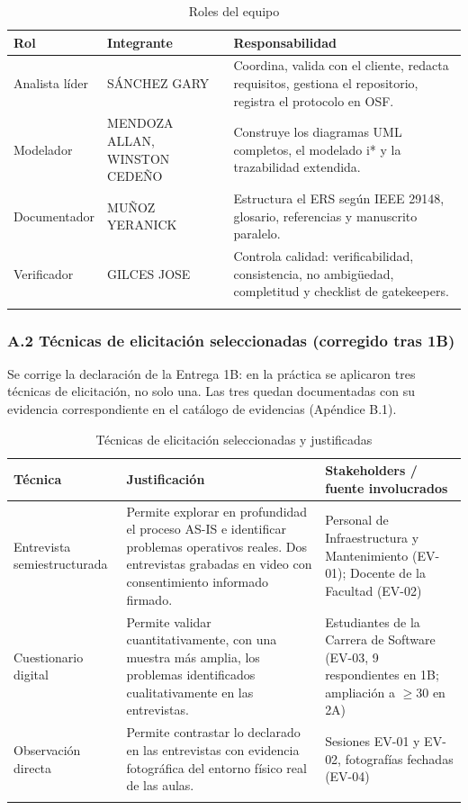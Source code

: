 
\begingroup
\small
\begin{longtable}{|p{5.2cm}|p{5.2cm}|p{5.2cm}|}
\hline
Rol & Integrante & Responsabilidad \\ \hline
Analista líder & SÁNCHEZ GARY & Coordina, valida con el cliente, redacta requisitos, gestiona el repositorio, registra el protocolo en OSF. \\ \hline
Modelador & MENDOZA ALLAN, WINSTON CEDEÑO & Construye los diagramas UML completos, el modelado i* y la trazabilidad extendida. \\ \hline
Documentador & MUÑOZ YERANICK & Estructura el ERS según IEEE 29148, glosario, referencias y manuscrito paralelo. \\ \hline
Verificador & GILCES JOSE & Controla calidad: verificabilidad, consistencia, no ambigüedad, completitud y checklist de gatekeepers. \\ \hline
\caption{Roles del equipo}
\end{longtable}
\endgroup

\subsubsection*{A.2 Técnicas de elicitación seleccionadas (corregido tras 1B)}


Se corrige la declaración de la Entrega 1B: en la práctica se aplicaron tres técnicas de elicitación, no solo una. Las tres quedan documentadas con su evidencia correspondiente en el catálogo de evidencias (Apéndice B.1).


\begingroup
\small
\begin{longtable}{|p{5.2cm}|p{5.2cm}|p{5.2cm}|}
\hline
Técnica & Justificación & Stakeholders / fuente involucrados \\ \hline
Entrevista semiestructurada & Permite explorar en profundidad el proceso AS-IS e identificar problemas operativos reales. Dos entrevistas grabadas en video con consentimiento informado firmado. & Personal de Infraestructura y Mantenimiento (EV-01); Docente de la Facultad (EV-02) \\ \hline
Cuestionario digital & Permite validar cuantitativamente, con una muestra más amplia, los problemas identificados cualitativamente en las entrevistas. & Estudiantes de la Carrera de Software (EV-03, 9 respondientes en 1B; ampliación a $\geq$30 en 2A) \\ \hline
Observación directa & Permite contrastar lo declarado en las entrevistas con evidencia fotográfica del entorno físico real de las aulas. & Sesiones EV-01 y EV-02, fotografías fechadas (EV-04) \\ \hline
\caption{Técnicas de elicitación seleccionadas y justificadas}
\end{longtable}
\endgroup

